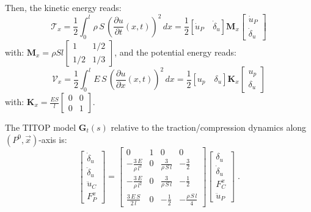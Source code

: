 Then, the kinetic energy reads:
\[
\mathcal{T}_x=\frac{1}{2}\int_{0}^l\rho\,S\,\left(\frac{\partial u}{\partial t}(x,t)\right)^2 \,dx=\frac{1}{2}[\dot{u}_P \quad \dot{\delta}_u]\mathbf{M}_x\left[\begin{array}{c}\dot{u}_P \\ \dot{\delta}_u \end{array}\right]
\]
with: $\mathbf{M}_x=\rho S l\left[\begin{array}{cc}1 & 1/2 \\ 1/2 & 1/3 \end{array}\right]$,
and the potential energy reads:
\[
\mathcal{V}_x=\frac{1}{2}\int_{0}^lE\,S\,\left(\frac{\partial u}{\partial x}(x,t)\right)^2 \,dx=\frac{1}{2}[u_p \quad \delta_u]\mathbf{K}_x\left[\begin{array}{c}u_p \\ \delta_u \end{array}\right]
\]
with: $\mathbf{K}_x=\frac{E S}{l}\left[\begin{array}{cc}0 & 0 \\ 0 & 1 \end{array}\right]$.

The TITOP model $\mathbf{G}_t(s)$ relative to the traction/compression dynamics along $(P^0,\vec{x})$-axis is:
\begin{equation} \label{eq:Gtss}
\left[\begin{array}{c} \dot{\delta}_u \\ \ddot{\delta}_u\\ \hline
\ddot{u}_C
 \\ 
F^x_P
 \end{array}\right]=\left[\begin{array}{cc|cc}
0 & 1 & 0 & 0\\ -\frac{3\,E}{\rho\,l^2} & 0 & \frac{3}{\rho\,S\,l} & -\frac{3}{2}\\ \hline -\frac{3\,E}{\rho\,l^2} & 0 & \frac{3}{\rho\,S\,l}  & -\frac{1}{2} \\ \frac{3\,E\,S}{2\,l} & 0 &  -\frac{1}{2} & -\frac{\rho\,S\,l}{4}\end{array}\right]\left[\begin{array}{c} \delta_u \\ \dot{\delta}_u \\ \hline  
F^x_C
\\ 
\ddot{u}_P
 \end{array}\right]
\;.
\end{equation}

